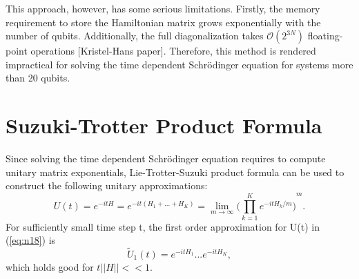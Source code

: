 \documentclass[12]{article}
\begin{document}
This approach, however, has some serious limitations. Firstly, the memory requirement to store the Hamiltonian matrix grows exponentially with the number of qubits. Additionally, the full diagonalization takes $\mathcal{O}(2^{3N})$ floating-point operations [Kristel-Hans paper]. Therefore, this method is rendered impractical for solving the time dependent Schr{\"o}dinger equation for systems more than 20 qubits.

\section{Suzuki-Trotter Product Formula} 
Since solving the time dependent Schr{\"o}dinger equation requires to compute unitary matrix exponentials, Lie-Trotter-Suzuki product formula can be used to construct the following unitary approximations:
\begin{equation}
U(t)= e^{-itH}= e^{-it(H_1+...+H_K)}= \lim\limits_{m \to \infty} {\bigg(\prod_{k=1}^{K}e^{-itH_k/m} \bigg)}^m.    \label{eq:b15}
\end{equation}
For sufficiently small time step t, the first order approximation for U(t) in (\ref{eq:n18}) is
\begin{equation}
\tilde{U}_1(t)=e^{-itH_1}...e^{-itH_K},    \label{eq:b16}
\end{equation}
which holds good for $t \left| \left| H \right| \right| << 1$.
\end{document}
